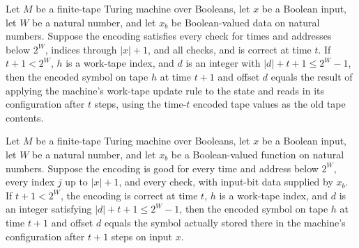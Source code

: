 \begin{theorem}
\label{Complexity.Meyer.work_rule}
\leanok
{}
Let $M$ be a finite-tape Turing machine over Booleans, let $x$ be a Boolean input, let
$W$ be a natural number, and let $x_b$ be Boolean-valued data on natural numbers.
Suppose the encoding satisfies every check for times and addresses below $2^W$, indices
through $|x|+1$, and all checks, and is correct at time $t$. If $t+1<2^W$, $h$ is a
work-tape index, and $d$ is an integer with $|d|+t+1\le 2^W-1$, then the encoded symbol
on tape $h$ at time $t+1$ and offset $d$ equals the result of applying the machine's
work-tape update rule to the state and reads in its configuration after $t$ steps, using
the time-$t$ encoded tape values as the old tape contents.
\end{theorem}

\begin{theorem}
\label{Complexity.Meyer.work_correct}
\leanok
{}
Let $M$ be a finite-tape Turing machine over Booleans, let $x$ be a Boolean input, let
$W$ be a natural number, and let $x_b$ be a Boolean-valued function on natural numbers.
Suppose the encoding is good for every time and address below $2^W$, every index $j$ up
to $|x|+1$, and every check, with input-bit data supplied by $x_b$. If $t+1<2^W$, the
encoding is correct at time $t$, $h$ is a work-tape index, and $d$ is an integer
satisfying $|d|+t+1\le 2^W-1$, then the encoded symbol on tape $h$ at time $t+1$ and
offset $d$ equals the symbol actually stored there in the machine's configuration after
$t+1$ steps on input $x$.
\end{theorem}
